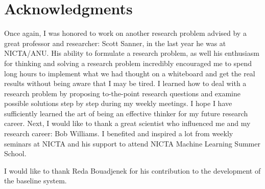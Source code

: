 \chapter*{Acknowledgments}

Once again, I was honored to work on another research problem advised by a great professor and researcher: Scott Sanner, in the last year he was at NICTA/ANU. His ability to formulate a research problem, as well his enthusiasm for thinking and solving a research problem incredibly encouraged me to spend long hours to implement what we had thought on a whiteboard and get the real results without being aware that I may be tired. I learned how to deal with a research problem by proposing to-the-point research questions and examine possible solutions step by step during my weekly meetings. I hope I have sufficiently learned the art of being an effective thinker for my future research career. Next, I would like to thank a great scientist who influenced me and my research career: Bob Williams. I benefited and inspired a lot from weekly seminars at NICTA and his support to attend NICTA Machine Learning Summer School.  

I would like to thank Reda Bouadjenek for his contribution to the development of the baseline system. 